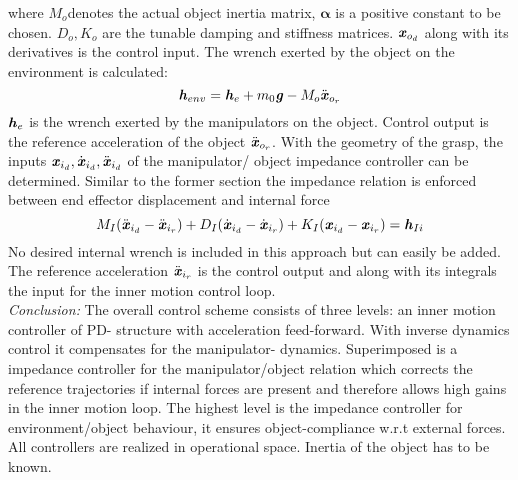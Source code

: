 \documentclass[conference]{IEEEtran}
\begin{document}
where $ M_o $denotes the actual object inertia matrix, $ \boldsymbol{\alpha} $ is a positive constant to be chosen. $ D_o, K_o $ are the tunable damping and stiffness matrices. $ \textbf{\textit{x}}_{o_d} $ along with its derivatives is the control input. The wrench exerted by the object on the environment is calculated:
\begin{equation}
\textbf{\textit{h}}_{env} = \textbf{\textit{h}}_{e} +m_0\textbf{\textit{g}} - M_o\ddot{\textbf{\textit{x}}}_{o_r}
\end{equation}
$ \textbf{\textit{h}}_e $ is the wrench exerted by the manipulators on the object. Control output is the reference acceleration of the object $ \ddot{\textbf{\textit{x}}}_{o_r} $. With the geometry of the grasp, the inputs $ \textbf{\textit{x}}_{i_d}, \dot{\textbf{\textit{x}}}_{i_d}, \ddot{\textbf{\textit{x}}}_{i_d}  $ of the manipulator/ object impedance controller can be determined. Similar to the former section the impedance relation is enforced between end effector displacement and internal force
\begin{equation}
M_I(\ddot{\textbf{\textit{x}}}_{i_d} - \ddot{\textbf{\textit{x}}}_{i_r})  + D_I(\dot{\textbf{\textit{x}}}_{i_d} - \dot{\textbf{\textit{x}}}_{i_r}) + K_I(\textbf{\textit{x}}_{i_d} - \textbf{\textit{x}}_{i_r})  = \textbf{\textit{h}}_{Ii}
\end{equation}
No desired internal wrench is included in this approach but can easily be added. The reference acceleration $ \ddot{\textbf{\textit{x}}}_{i_r} $ is the control output and along with its integrals the input for the inner motion control loop. \\
\emph{Conclusion: } The overall control scheme consists of three levels: an inner motion controller of PD- structure with acceleration feed-forward. With inverse dynamics control it compensates for the manipulator- dynamics. Superimposed is a impedance controller for the manipulator/object relation which corrects the reference trajectories if internal forces are present and therefore allows high gains in the inner motion loop. The highest level is the impedance controller for environment/object behaviour, it ensures object-compliance w.r.t external forces. All controllers are realized in operational space. Inertia of the object has to be known.

\end{document}
